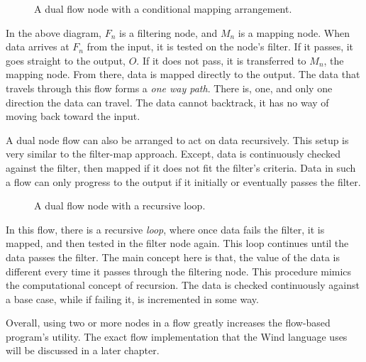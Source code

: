 \begin{figure}[h]
\centering
{}
\caption{A dual flow node with a conditional mapping arrangement.}
\end{figure}

\par In the above diagram, $F_n$ is a filtering node, and $M_n$ is a mapping node. When data arrives at $F_n$ from the input, it is tested on the node's filter. If it passes, it goes straight to the output, $O$. If it does not pass, it is transferred to $M_n$, the mapping node. From there, data is mapped directly to the output. The data that travels through this flow forms a \emph{one way path}. There is, one, and only one direction the data can travel. The data cannot backtrack, it has no way of moving back toward the input. 
\par A dual node flow can also be arranged to act on data recursively. This setup is very similar to the filter-map approach. Except, data is continuously checked against the filter, then mapped if it does not fit the filter's criteria. Data in such a flow can only progress to the output if it initially or eventually passes the filter. 

\begin{figure}[h]
\centering
{}
\caption{A dual flow node with a recursive loop.}
\end{figure}

\par In this flow, there is a recursive \emph{loop}, where once data fails the filter, it is mapped, and then tested in the filter node again. This loop continues until the data passes the filter. The main concept here is that, the value of the data is different every time it passes through the filtering node. This procedure mimics the computational concept of recursion. The data is checked continuously against a base case, while if failing it, is incremented in some way.
\par Overall, using two or more nodes in a flow greatly increases the flow-based program's utility. The exact flow implementation that the Wind language uses will be discussed in a later chapter.


